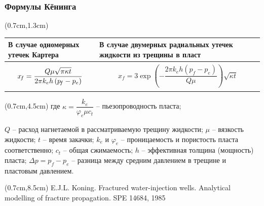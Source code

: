 \documentclass{beamer}
\begin{document}
\begin{frame}
\frametitle{Формулы Кёнинга}
\small
\begin{textblock*}{11cm}(0.7cm,1.3cm)
\begin{tabular}{|p{4.3cm}|p{5.9cm}|}
\hline
В случае одномерных утечек Картера & В случае двумерных радиальных утечек жидкости из трещины в пласт\\
\hline
$$x_{\!f}=\frac{Q\mu\sqrt{\pi\kappa t}}{2\pi k_eh\left(p_{\!f}-p_e\right)}
\vspace*{-3mm}$$ & $$x_{\!f}=3\exp{\!\left(-\frac{2\pi k_e h\left(p_{\!f}-p_e\right)}{Q\mu}\right)}\sqrt{\kappa t}$$ \\
\hline
\end{tabular}
\end{textblock*}

\begin{textblock*}{11cm}(0.7cm,4.5cm)
где
$\kappa=\dfrac{k_e}{\varphi_e\mu c_t}$ -- пьезопроводность пласта;\newline

$Q$ -- расход нагнетаемой в рассматриваемую трещину жидкости;\newline
$\mu$ -- вязкость жидкости;
$t$ -- время закачки;\newline
$k_e$ и $\varphi_e$ -- проницаемость и пористость пласта соответственно;\newline
$c_t$ -- общая сжимаемость;
$h$ -- эффективная толщина (мощность) пласта;
$\Delta p=p_{\!f}-p_e$ -- разница между средним давлением в трещине и пластовым давлением.
\end{textblock*}
\normalsize

\begin{textblock*}{10cm}(0.7cm,8.5cm)
\scriptsize
\textcolor{lit_gray}{E.J.L. Koning. Fractured water-injection wells. Analytical modelling of fracture propagation. SPE 14684, 1985}
\end{textblock*}

\normalsize

\end{frame}
\end{document}
